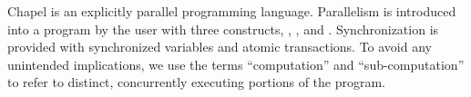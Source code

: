 Chapel is an explicitly parallel programming language. Parallelism is
introduced into a program by the user with three constructs,
, , and .  Synchronization is
provided with synchronized variables and atomic transactions. To avoid
any unintended implications, we use the terms ``computation'' and
``sub-computation'' to refer to distinct, concurrently executing
portions of the program.

